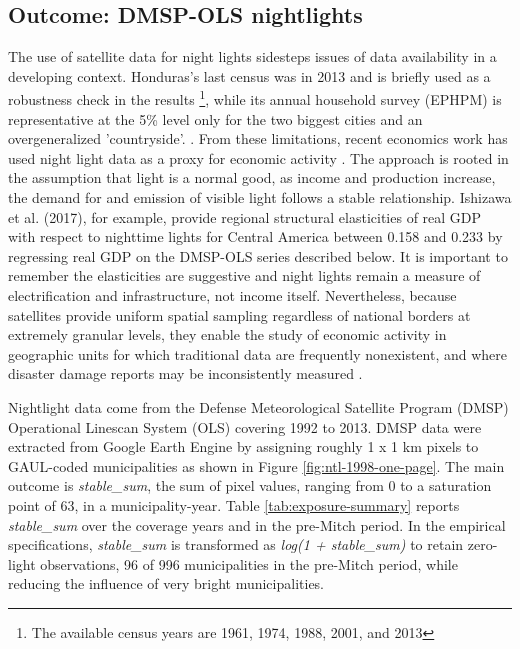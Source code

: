 \documentclass[12pt]{article}
\begin{document}
\subsection{Outcome: DMSP-OLS nightlights}
The use of satellite data for night lights sidesteps issues of data availability in a developing context. Honduras's last census was in 2013 and is briefly used as a robustness check in the results \footnote{The available census years are 1961, 1974, 1988, 2001, and 2013}, while its annual household survey (EPHPM) is representative at the 5\% level only for the two biggest cities and an overgeneralized 'countryside'. \parencite{ipumsinternational2025}.
From these limitations, recent economics work has used night light data as a proxy for economic activity \parencite{donaldson2016view, henderson2011bright}. The approach is rooted in the assumption that light is a normal good, as income and production increase, the demand for and emission of visible light follows a stable relationship.  Ishizawa et al. (2017), for example, provide regional structural elasticities of real GDP with respect to nighttime lights for Central America between 0.158 and 0.233 by regressing real GDP on the DMSP-OLS series described below. It is important to remember the elasticities are suggestive and night lights remain a measure of electrification and infrastructure, not income itself. Nevertheless, because satellites provide uniform spatial sampling regardless of national borders at extremely granular levels, they enable the study of economic activity in geographic units for which traditional data are frequently nonexistent, and where disaster damage reports may be inconsistently measured \parencite{donaldson2016view, henderson2011bright}.

Nightlight data come from the Defense Meteorological Satellite Program (DMSP) Operational Linescan System (OLS) covering 1992 to 2013. DMSP data were extracted from Google Earth Engine by assigning roughly 1 x 1 km pixels to GAUL-coded municipalities as shown in Figure \ref{fig:ntl-1998-one-page}. The main outcome is \textit{stable\_sum}, the sum of pixel values, ranging from 0 to a saturation point of 63, in a municipality-year. Table \ref{tab:exposure-summary} reports \textit{stable\_sum} over the coverage years and in the pre-Mitch period. In the empirical specifications, \textit{stable\_sum} is transformed as \textit{log(1 + stable\_sum)} to retain zero-light observations, 96 of 996 municipalities in the pre-Mitch period, while reducing the influence of very bright municipalities. 
\end{document}
